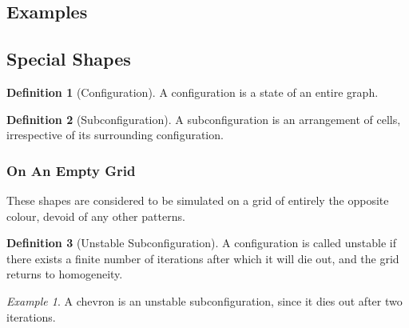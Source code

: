 \documentclass[12pt]{article}
\theoremstyle{definition}
\newtheorem{definition}{Definition}%
\theoremstyle{remark}
\theoremstyle{remark}
\newtheorem{example}{Example}%
\begin{document}

\subsection{Examples}


\subsection{Special Shapes} \label{SpecialShapes}

\par


\begin{definition}[Configuration]
A configuration is a state of an entire graph.
\end{definition}

\begin{definition}[Subconfiguration]
A subconfiguration is an arrangement of cells, irrespective of its surrounding configuration.
\end{definition}


\subsubsection{On An Empty Grid} \label{EmptyGrid}
\par
These shapes are considered to be simulated on a grid of entirely the opposite colour, devoid of any other patterns.

\begin{definition}[Unstable Subconfiguration]
A configuration is called unstable if there exists a finite number of iterations after which it will die out, and the grid returns to homogeneity. 
\end{definition}
\begin{example}
A chevron is an unstable subconfiguration, since it dies out after two iterations.


\end{example}
\end{document}
